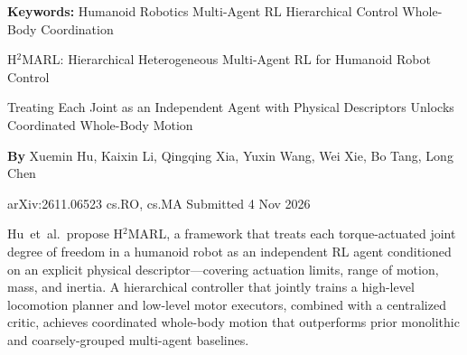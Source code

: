 \documentclass[10pt,twocolumn]{article}
\begin{document}
\setlength{\parindent}{0pt}
\setlength{\parskip}{4pt}

{\small\color{keywordgray}\textbf{Keywords:}
  Humanoid Robotics \textbullet{} Multi-Agent RL \textbullet{} Hierarchical Control \textbullet{} Whole-Body Coordination}\par\vspace{4pt}

{\LARGE\bfseries\raggedright H$^2$MARL: Hierarchical Heterogeneous Multi-Agent RL for Humanoid Robot Control}\par\vspace{4pt}
{\large\itshape\raggedright Treating Each Joint as an Independent Agent with Physical Descriptors Unlocks Coordinated Whole-Body Motion}\par\vspace{6pt}
{\small\textbf{By} Xuemin Hu, Kaixin Li, Qingqing Xia, Yuxin Wang, Wei Xie, Bo Tang, Long Chen}\par\vspace{2pt}
{\small\color{keywordgray}arXiv:2611.06523 \textbullet{} cs.RO, cs.MA \textbullet{} Submitted 4 Nov 2026}
\par\vspace{2pt}\noindent{\color{rulered}\rule{\columnwidth}{0.6pt}}\vspace{6pt}

Hu~et~al.\ propose H$^2$MARL, a framework that treats each torque-actuated joint degree of freedom in a humanoid robot as an independent RL agent conditioned on an explicit physical descriptor---covering actuation limits, range of motion, mass, and inertia.
A hierarchical controller that jointly trains a high-level locomotion planner and low-level motor executors, combined with a centralized critic, achieves coordinated whole-body motion that outperforms prior monolithic and coarsely-grouped multi-agent baselines.
\end{document}
